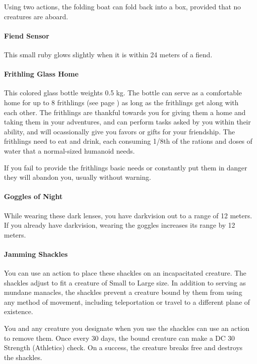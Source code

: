        Using two actions, the folding boat can fold back into a box, provided that no creatures are aboard.
    \paragraph{Fiend Sensor}
        This small ruby glows slightly when it is within 24 meters of a fiend.
    \paragraph{Frithling Glass Home} %
        This colored glass bottle weights 0.5 kg.
        The bottle can serve as a comfortable home for up to 8 frithlings (see page \pageref{creature::frithling}) as long as the frithlings get along with each other.
        The frithlings are thankful towards you for giving them a home and taking them in your adventures, and can perform tasks asked by you within their ability, and will ocassionally give you favors or gifts for your friendship.
        The frithlings need to eat and drink, each consuming 1/8th of the rations and doses of water that a normal-sized humanoid needs.

        If you fail to provide the frithlings basic needs or constantly put them in danger they will abandon you, usually without warning.
    \paragraph{Goggles of Night}
        While wearing these dark lenses, you have darkvision out to a range of 12 meters.
        If you already have darkvision, wearing the goggles increases its range by 12 meters.
    \paragraph{Jamming Shackles}
        You can use an action to place these shackles on an incapacitated creature.
        The shackles adjust to fit a creature of Small to Large size.
        In addition to serving as mundane manacles, the shackles prevent a creature bound by them from using any method of movement, including teleportation or travel to a different plane of existence.

        You and any creature you designate when you use the shackles can use an action to remove them.
        Once every 30 days, the bound creature can make a DC 30 Strength (Athletics) check.
        On a success, the creature breaks free and destroys the shackles.
